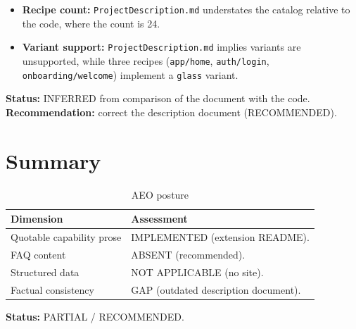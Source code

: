 \begin{itemize}
  \item \textbf{Recipe count:} \texttt{ProjectDescription.md} understates the
        catalog relative to the code, where the count is 24.
  \item \textbf{Variant support:} \texttt{ProjectDescription.md} implies variants
        are unsupported, while three recipes (\texttt{app/home},
        \texttt{auth/login}, \texttt{onboarding/welcome}) implement a
        \texttt{glass} variant.
\end{itemize}

\textbf{Status:} INFERRED from comparison of the document with the code.
\textbf{Recommendation:} correct the description document (RECOMMENDED).

\section{Summary}

\begin{table}[H]
\centering
\caption{AEO posture}
\begin{tabular}{p{4.6cm}p{9.6cm}}
\toprule
\textbf{Dimension} & \textbf{Assessment} \\
\midrule
Quotable capability prose & IMPLEMENTED (extension README). \\
FAQ content & ABSENT (recommended). \\
Structured data & NOT APPLICABLE (no site). \\
Factual consistency & GAP (outdated description document). \\
\bottomrule
\end{tabular}
\end{table}

\textbf{Status:} PARTIAL / RECOMMENDED.

